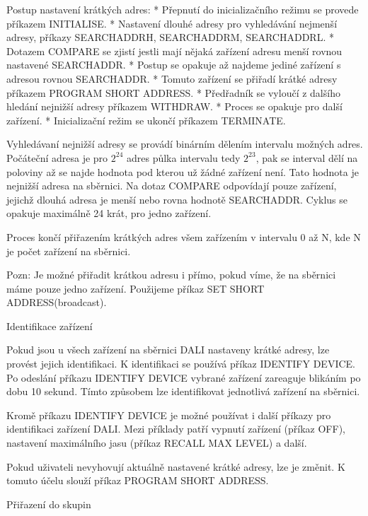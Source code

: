 Postup nastavení krátkých adres:
\begitems
    * Přepnutí do inicializačního režimu se provede příkazem INITIALISE.
    * Nastavení dlouhé adresy pro vyhledávání nejmenší adresy, příkazy SEARCHADDRH, SEARCHADDRM, SEARCHADDRL.
    * Dotazem COMPARE se zjistí jestli mají nějaká zařízení adresu menší rovnou nastavené SEARCHADDR.
    * Postup se opakuje až najdeme jediné zařízení s adresou rovnou SEARCHADDR.
    * Tomuto zařízení se přiřadí krátké adresy příkazem PROGRAM SHORT ADDRESS.
    * Předřadník se vyloučí z dalšího hledání nejnižší adresy příkazem WITHDRAW.
    * Proces se opakuje pro další zařízení.
    * Inicializační režim se ukončí příkazem TERMINATE.
\enditems

Vyhledávaní nejnižší adresy se provádí binárním dělením intervalu možných adres. Počáteční adresa je
pro $2^{24}$ adres půlka intervalu tedy $2^{23}$, pak se interval dělí na poloviny až se najde hodnota pod kterou už
žádné zařízení není. Tato hodnota je nejnižší adresa na sběrnici. Na dotaz COMPARE odpovídají pouze
zařízení, jejichž dlouhá adresa je menší nebo rovna hodnotě SEARCHADDR. Cyklus se opakuje maximálně 24 krát,
pro jedno zařízení. %

Proces končí přiřazením krátkých adres všem zařízením v intervalu 0 až N, kde N je počet zařízení na sběrnici.

Pozn: Je možné přiřadit krátkou adresu i přímo, pokud víme, že na sběrnici máme pouze jedno zařízení.
Použijeme příkaz SET SHORT ADDRESS(broadcast).

\medskip \noindent
{\sbf Identifikace zařízení}

Pokud jsou u všech zařízení na sběrnici DALI nastaveny krátké adresy, lze provést jejich identifikaci.
K identifikaci se používá příkaz IDENTIFY DEVICE.
Po odeslání příkazu IDENTIFY DEVICE vybrané zařízení zareaguje blikáním po dobu 10 sekund.
Tímto způsobem lze identifikovat jednotlivá zařízení na sběrnici.


Kromě příkazu IDENTIFY DEVICE je možné používat i další příkazy pro identifikaci zařízení DALI.
Mezi příklady patří vypnutí zařízení (příkaz OFF), nastavení maximálního jasu (příkaz RECALL MAX LEVEL)
a další.

Pokud uživateli nevyhovují aktuálně nastavené krátké adresy, lze je změnit.
K tomuto účelu slouží příkaz PROGRAM SHORT ADDRESS.


\medskip \noindent
{\sbf Přiřazení do skupin}


